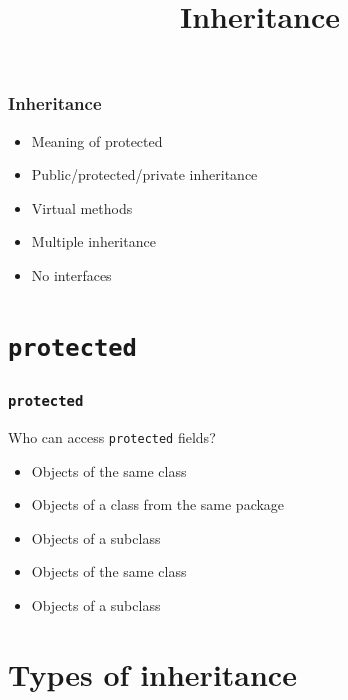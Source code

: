 

\usetikzlibrary{arrows.meta}

\title{Inheritance}


\lstset{language=c++14}




\begin{frame}
  \titlepage
\end{frame}

\begin{frame}
  \frametitle{Inheritance}
  \begin{itemize}
    \item Meaning of protected
    \item Public/protected/private inheritance
    \item Virtual methods
    \item Multiple inheritance
    \item No interfaces
  \end{itemize}
\end{frame}

\section{{\tt protected}}

\begin{frame}
  \tableofcontents[currentsection]
\end{frame}

\begin{frame}
  \frametitle{{\tt protected}}
  \begin{center}
    Who can access \texttt{protected} fields?
  \end{center}
  \begin{itemize}
    \item Objects of the same class
    \item Objects of a class from the same package
    \item Objects of a subclass
  \end{itemize}
  \vskip5mm
  \begin{itemize}
    \item Objects of the same class
    \item Objects of a subclass
  \end{itemize}
\end{frame}


\section{Types of inheritance}

